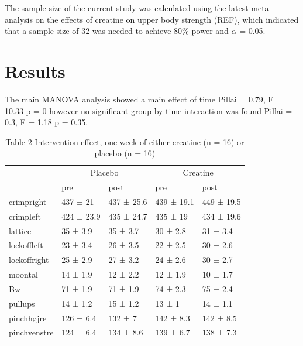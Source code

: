 \documentclass[
]{article}
\begin{document}
The sample size of the current study was calculated using the latest
meta analysis on the effects of creatine on upper body strength (REF),
which indicated that a sample size of 32 was needed to achieve 80\%
power and \(\alpha\) = 0.05.

\hypertarget{results}{%
\section{Results}\label{results}}

The main MANOVA analysis showed a main effect of time Pillai = 0.79, F =
10.33 p = 0 however no significant group by time interaction was found
Pillai = 0.3, F = 1.18 p = 0.35.

\begin{table}

\caption{\label{tab:unnamed-chunk-6}Table 2 
 Intervention effect, one week of either creatine (n = 16) or placebo (n = 16)}
\centering
\begin{tabular}[t]{l|l|l|l|l}
\hline
\multicolumn{1}{c|}{ } & \multicolumn{2}{c|}{Placebo} & \multicolumn{2}{c}{Creatine} \\
\cline{2-3} \cline{4-5}
  & pre & post & pre & post\\
\hline
crimpright & 437 ± 21 & 437 ± 25.6 & 439 ± 19.1 & 449 ± 19.5\\
\hline
crimpleft & 424 ± 23.9 & 435 ± 24.7 & 435 ± 19 & 434 ± 19.6\\
\hline
lattice & 35 ± 3.9 & 35 ± 3.7 & 30 ± 2.8 & 31 ± 3.4\\
\hline
lockoffleft & 23 ± 3.4 & 26 ± 3.5 & 22 ± 2.5 & 30 ± 2.6\\
\hline
lockoffright & 25 ± 2.9 & 27 ± 3.2 & 24 ± 2.6 & 30 ± 2.7\\
\hline
moontal & 14 ± 1.9 & 12 ± 2.2 & 12 ± 1.9 & 10 ± 1.7\\
\hline
Bw & 71 ± 1.9 & 71 ± 1.9 & 74 ± 2.3 & 75 ± 2.4\\
\hline
pullups & 14 ± 1.2 & 15 ± 1.2 & 13 ± 1 & 14 ± 1.1\\
\hline
pinchhøjre & 126 ± 6.4 & 132 ± 7 & 142 ± 8.3 & 142 ± 8.5\\
\hline
pinchvenstre & 124 ± 6.4 & 134 ± 8.6 & 139 ± 6.7 & 138 ± 7.3\\
\hline
\end{tabular}
\end{table}
\end{document}
